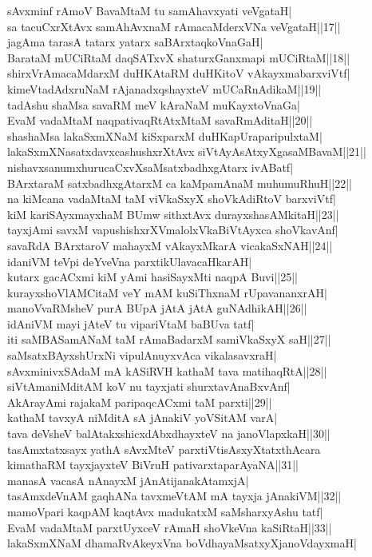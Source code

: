\documentclass{article}
\begin{document}
sAvxminf rAmoV BavaMtaM tu samAhavxyati veVgataH|\\
sa tacuCxrXtAvx samAhAvxnaM rAmacaMderxVNa veVgataH||17||\\
jagAma tarasA tatarx yatarx saBArxtaqkoVnaGaH|\\
BarataM mUCiRtaM daqSATxvX shaturxGanxmapi mUCiRtaM||18||\\
shirxVrAmacaMdarxM duHKAtaRM duHKitoV vAkayxmabarxviVtf|\\
kimeVtadAdxruNaM rAjanadxqshayxteV mUCaRnAdikaM||19||\\
tadAshu shaMsa savaRM meV kAraNaM muKayxtoVnaGa|\\
EvaM vadaMtaM naqpativaqRtAtxMtaM savaRmAditaH||20||\\
shashaMsa lakaSxmXNaM kiSxparxM duHKapUraparipulxtaM|\\
lakaSxmXNasatxdavxcashushxrXtAvx siVtAyAsAtxyXgasaMBavaM||21||\\
nishavxsanumxhurucaCxvXsaMsatxbadhxgAtarx ivABatf|\\
BArxtaraM satxbadhxgAtarxM ca kaMpamAnaM muhumuRhuH||22||\\
na kiMcana vadaMtaM taM viVkaSxyX shoVkAdiRtoV barxviVtf|\\
kiM kariSAyxmayxhaM BUmw sithxtAvx durayxshasAMkitaH||23||\\
tayxjAmi savxM vapushishxrXVmalolxVkaBiVtAyxca shoVkavAnf|\\
savaRdA BArxtaroV mahayxM vAkayxMkarA vicakaSxNAH||24||\\
idaniVM teVpi deYveVna parxtikUlavacaHkarAH|\\
kutarx gacACxmi kiM yAmi hasiSayxMti naqpA Buvi||25||\\
kurayxshoVlAMCitaM veY mAM kuSiThxnaM rUpavananxrAH|\\
manoVvaRMsheV purA BUpA jAtA jAtA guNAdhikAH||26||\\
idAniVM mayi jAteV tu vipariVtaM baBUva tatf|\\
iti saMBASamANaM taM rAmaBadarxM samiVkaSxyX saH||27||\\
saMsatxBAyxshUrxNi vipulAnuyxvAca vikalasavxraH|\\
sAvxminivxSAdaM mA kASiRVH kathaM tava matihaqRtA||28||\\
siVtAmaniMditAM koV nu tayxjati shurxtavAnaBxvAnf|\\
AkArayAmi rajakaM paripaqcACxmi taM parxti||29||\\
kathaM tavxyA niMditA sA jAnakiV yoVSitAM varA|\\
tava deVsheV balAtakxshicxdAbxdhayxteV na janoVlapxkaH||30||\\
tasAmxtatxsayx yathA sAvxMteV parxtiVtisAsxyXtatxthAcara\\
kimathaRM tayxjayxteV BiVruH pativarxtaparAyaNA||31||\\
manasA vacasA nAnayxM jAnAtijanakAtamxjA|\\
tasAmxdeVnAM gaqhANa tavxmeVtAM mA tayxja jAnakiVM||32||\\
mamoVpari kaqpAM kaqtAvx madukatxM saMsharxyAshu tatf|\\
EvaM vadaMtaM parxtUyxceV rAmaH shoVkeVna kaSiRtaH||33||\\
lakaSxmXNaM dhamaRvAkeyxVna boVdhayaMsatxyXjanoVdayxmaH|\\
\end{document}
